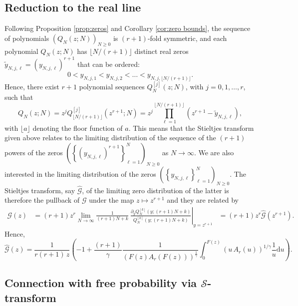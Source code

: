 \documentclass[12pt]{article}
\newcommand{\St}{\mathcal{S}} %
\newcommand{\Gt}{\mathcal{G}} %
\numberwithin{equation}{section}
\begin{document}
\subsection{Reduction to the real line}
Following Proposition \ref{prop:zeros} and Corollary \ref{cor:zero bounds}, the sequence of polynomials  $(Q_N(z;N))_{N\geq 0}$ is $(r+1)$-fold symmetric, and each polynomial $Q_N(z;N)$ has  $\lfloor N/(r+1)\rfloor$ distinct real zeros $\widetilde{y}_{N,j,\ell}=({y}_{N,j,\ell})^{r+1}$ that can be ordered: 
\[
	0<y_{N,j,1} < y_{N,j,2}  <\ldots < y_{N,j,\lfloor N/(r+1)\rfloor} . 
\]
Hence, there exist $r+1$ polynomial sequences $Q_N^{[j]}(z;N)$, with $j=0,1,\ldots, r$,  such that 
\[
	Q_{N}(z;N) = z^j Q_{\lfloor N/(r+1)\rfloor}^{[j]}(z^{r+1};N)=z^j \prod_{\ell=1}^{\lfloor N/(r+1)\rfloor} \left( z^{r+1} - \widetilde{y}_{N,j,\ell}\right), 
\] 
with  $\lfloor a\rfloor$ denoting the floor function of $a$. 
This means that the Stieltjes transform given above relates to the limiting distribution of the sequence of the $(r+1)$ powers of the zeros $\left(\left\{({y}_{N,j,\ell})^{r+1}\right\}_{\ell=1}^N\right)_{N\geq0}$ as $N\to \infty$. We are also interested in the limiting distribution of the zeros $\left(\left\{ y_{N,j,\ell} \right\}_{\ell=1}^N\right)_{N\geq0}$. The Stieltjes transform, say \(\widehat{\Gt}\), of the limiting zero distribution of the latter  is therefore the pullback of \(\Gt\) under the map \(z\mapsto z^{r+1}\) and they are related by 
\begin{align*}
 	\Gt(z) %
	&= 	(r+1) z^{r}\lim_{N \to \infty} \frac{1}{(r+1)N+k}\  \left.\frac{  \partial_yQ_{N}^{[k]}(y;(r+1)N+k)}{  Q_{ N}^{[k]}(y;(r+1)N+k)}\right|_{y=z^{r+1}} 
	&= (r+1) z^r \widehat{\Gt}(z^{r+1}). 
\end{align*}
Hence, 
\[
	\widehat{\Gt}(z) = \frac{1}{r(r+1)\,z}  
	\left(- 1+  \frac{(r+1)}{\gamma} \frac{1}{\left(F(z) A_r(F(z))\right)^{\frac{1}{\gamma}}} \int_0^{F(z)}  \left(u \, A_r(u)\right) ^{1/\gamma}	\frac{1}{u}\mathrm{d}u  \right).
\]


 


\subsection{Connection with free probability via $\St$-transform}
\end{document}
